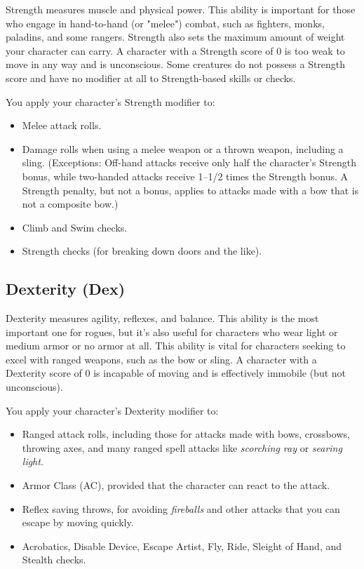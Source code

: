 				
Strength measures muscle and physical power. This ability is important for those who engage in hand-to-hand (or "melee") combat, such as fighters, monks, paladins, and some rangers. Strength also sets the maximum amount of weight your character can carry. A character with a Strength score of 0 is too weak to move in any way and is unconscious. Some creatures do not possess a Strength score and have no modifier at all to Strength-based skills or checks.
				
You apply your character's Strength modifier to:
				\begin{itemize}\item  Melee attack rolls.
				\item  Damage rolls when using a melee weapon or a thrown weapon, including a sling. (Exceptions: Off-hand attacks receive only half the character's Strength bonus, while two-handed attacks receive 1--1/2 times the Strength bonus. A Strength penalty, but not a bonus, applies to attacks made with a bow that is not a composite bow.)
				\item  Climb and Swim checks.
				\item  Strength checks (for breaking down doors and the like).
\end{itemize}
				
\subsection{Dexterity (Dex)}

				
Dexterity measures agility, reflexes, and balance. This ability is the most important one for rogues, but it's also useful for characters who wear light or medium armor or no armor at all. This ability is vital for characters seeking to excel with ranged weapons, such as the bow or sling. A character with a Dexterity score of 0 is incapable of moving and is effectively immobile (but not unconscious).
				
You apply your character's Dexterity modifier to:
				\begin{itemize}\item  Ranged attack rolls, including those for attacks made with bows, crossbows, throwing axes, and many ranged spell attacks like \textit{scorching ray} or \textit{searing light}.
				\item  Armor Class (AC), provided that the character can react to the attack.
				\item  Reflex saving throws, for avoiding \textit{fireballs} and other attacks that you can escape by moving quickly.
				\item  Acrobatics, Disable Device, Escape Artist, Fly, Ride, Sleight of Hand, and Stealth checks.
\end{itemize}
				
